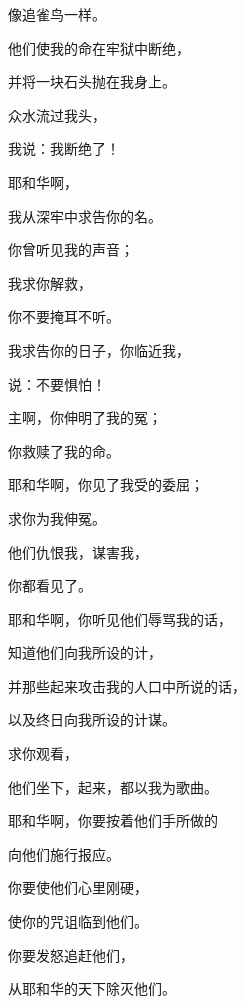 {\par }{\Q 像追雀鸟一样。
\par }{\Q {}他们使我的命在牢狱中断绝，
\par }{\Q 并将一块石头抛在我身上。
\par }{\Q {}众水流过我头，
\par }{\Q 我说：我{}断绝了！
\par }{\BB \par }{\Q {}耶和华啊，
\par }{\Q 我从深牢中求告你的名。
\par }{\Q {}你曾听见我的声音；
\par }{\Q 我求你解救，
\par }{\Q 你不要掩耳不听。
\par }{\Q {}我求告你的日子，你临近我，
\par }{\Q 说：不要惧怕！
\par }{\BB \par }{\Q {}主啊，你伸明了我的冤；
\par }{\Q 你救赎了我的命。
\par }{\Q {}耶和华啊，你见了我受的委屈；
\par }{\Q 求你为我伸冤。
\par }{\Q {}他们仇恨我，谋害我，
\par }{\Q 你都看见了。
\par }{\BB \par }{\Q {}耶和华啊，你听见他们辱骂我的话，
\par }{\Q 知道他们向我所设的计，
\par }{\Q {}并那些起来攻击我的人口中所说的话，
\par }{\Q 以及终日向我所设的计谋。
\par }{\Q {}求你观看，
\par }{\Q 他们坐下，起来，都以我为歌曲。
\par }{\BB \par }{\Q {}耶和华啊，你要按着他们手所做的
\par }{\Q 向他们施行报应。
\par }{\Q {}你要使他们心里刚硬，
\par }{\Q 使你的咒诅临到他们。
\par }{\Q {}你要发怒追赶他们，
\par }{\Q 从耶和华的天下除灭他们。

}
